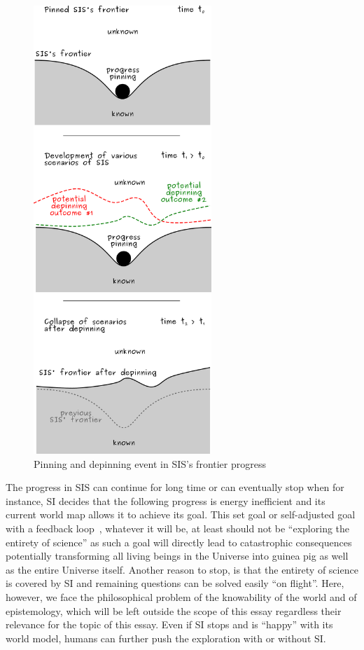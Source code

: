 \documentclass[a4paper,11pt]{article}
\begin{document}
\begin{figure}[ht!]
    \centering\includegraphics[width=0.6\textwidth]{depinning_2.pdf}
    \caption{\label{fig:pinning}Pinning and depinning event in SIS's frontier progress}
\end{figure}

The progress in SIS can continue for long time or can eventually stop when for instance, SI decides that the following progress is energy inefficient and its current world map allows it to achieve its goal. This set goal or self-adjusted goal with a feedback loop~\parencite{russell2019human}, whatever it will be, at least should not be ``exploring the entirety of science'' as such a goal will directly lead to catastrophic consequences~\cite{Bostrom2014,Yudkowsky2022} potentially transforming all living beings in the Universe into guinea pig as well as the entire Universe itself. Another reason to stop, is that the entirety of science is covered by SI and remaining questions can be solved easily ``on flight''. Here, however, we face the philosophical problem of the knowability of the world and of epistemology, which will be left outside the scope of this essay regardless their relevance for the topic of this essay.
Even if SI stops and is ``happy'' with its world model, humans can further push the exploration with or without SI.
\end{document}
